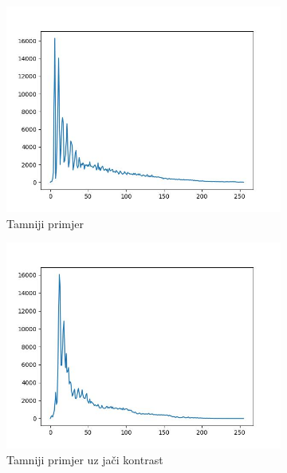 \documentclass[times, utf8, diplomski]{fer}
\begin{document}
\begin{figure}[H]
     \centering
     \begin{subfigure}[b]{0.4\textwidth}
         \centering
         \includegraphics[width=\textwidth]{figures/ce_examples/1/hist_clahe.jpg}
         \caption{Tamniji primjer}
     \end{subfigure}
     \begin{subfigure}[b]{0.4\textwidth}
         \centering
         \includegraphics[width=\textwidth]{figures/ce_examples/2/hist_clahe.jpg}
         \caption{Tamniji primjer uz jači kontrast}
     \end{subfigure}
     \begin{subfigure}[b]{0.4\textwidth}
         \centering

\end{subfigure}
\end{figure}
\end{document}

